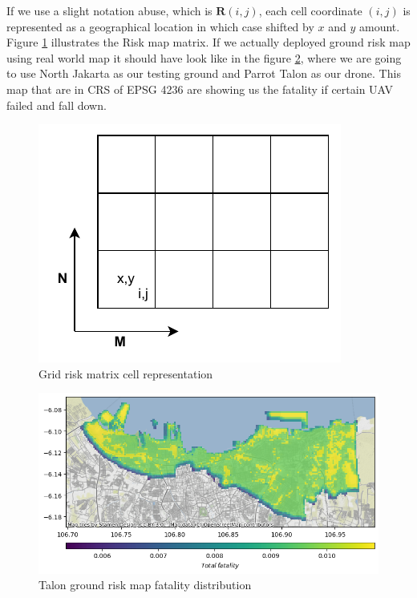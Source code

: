 \documentclass[12pt]{report}
\begin{document}
        If we use a slight notation abuse, which is \(\mathbf{R}(i,j)\), each cell coordinate \((i, j)\) is represented
        as a geographical location in which case shifted by \(x\) and \(y\) amount. Figure \ref{fig:riskmatrix}
        illustrates the Risk map matrix. If we actually deployed ground risk map using real world map it should have
        look like in the figure \ref{fig:riskmap}, where we are going to use North Jakarta as our testing ground and
        Parrot Talon as our drone. This map that are in \ac{CRS} of \ac{EPSG} 4236 are showing us the fatality if
        certain UAV failed and fall down.

        \begin{figure}[H]
            \label{fig:riskmatrix}
            \centering
            \includegraphics[width=\textwidth]{General Image/OSM Drone-RISK.pdf}
            \caption{Grid risk matrix cell representation}
        \end{figure}

        \begin{figure}[H]
            \label{fig:riskmap}
            \centering
            \includegraphics[width=\textwidth]{Plot/talon/total_fatality.png}
            \caption{Talon ground risk map fatality distribution}
        \end{figure}
\end{document}
